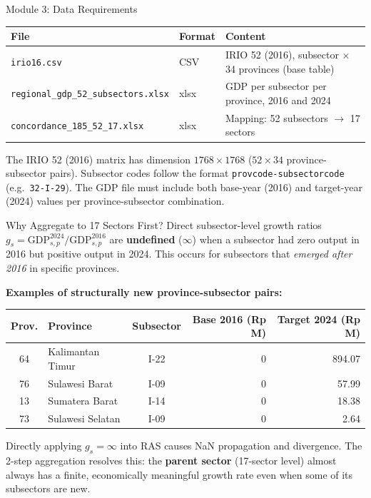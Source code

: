 \documentclass[aspectratio=169]{beamer}
\begin{document}
\begin{frame}{Module 3: Data Requirements}
\begin{center}
\renewcommand{\arraystretch}{1.3}
\scriptsize
\begin{tabular}{@{}p{5.0cm}p{1.0cm}p{6.6cm}@{}}
\toprule
\textbf{File} & \textbf{Format} & \textbf{Content} \\
\midrule
\texttt{irio16.csv} & CSV & IRIO 52 (2016), subsector $\times$ 34 provinces (base table) \\
\texttt{regional\_gdp\_52\_subsectors.xlsx} & xlsx & GDP per subsector per province, 2016 and 2024 \\
\texttt{concordance\_185\_52\_17.xlsx} & xlsx & Mapping: 52 subsectors $\to$ 17 sectors \\
\bottomrule
\end{tabular}
\end{center}

\medskip
\small
The IRIO 52 (2016) matrix has dimension $1768 \times 1768$ ($52 \times 34$ province-subsector pairs). Subsector codes follow the format \texttt{provcode-subsectorcode} (e.g.\ \texttt{32-I-29}). The GDP file must include both base-year (2016) and target-year (2024) values per province-subsector combination.
\end{frame}

\begin{frame}{Why Aggregate to 17 Sectors First?}
Direct subsector-level growth ratios $g_s = \text{GDP}_{s,p}^{2024} / \text{GDP}_{s,p}^{2016}$ are \textbf{undefined} ($\infty$) when a subsector had zero output in 2016 but positive output in 2024. This occurs for subsectors that \textit{emerged after 2016} in specific provinces.

\medskip
\textbf{Examples of structurally new province-subsector pairs:}

\begin{center}
\renewcommand{\arraystretch}{1.2}
\begin{tabular}{clcrr}
\toprule
\textbf{Prov.} & \textbf{Province} & \textbf{Subsector} & \textbf{Base 2016 (Rp M)} & \textbf{Target 2024 (Rp M)} \\
\midrule
64 & Kalimantan Timur  & I-22 & 0 & 894.07 \\
76 & Sulawesi Barat    & I-09 & 0 &  57.99 \\
13 & Sumatera Barat    & I-14 & 0 &  18.38 \\
73 & Sulawesi Selatan  & I-09 & 0 &   2.64 \\
\bottomrule
\end{tabular}
\end{center}

\medskip
\small
Directly applying $g_s = \infty$ into RAS causes NaN propagation and divergence. The 2-step aggregation resolves this: the \textbf{parent sector} (17-sector level) almost always has a finite, economically meaningful growth rate even when some of its subsectors are new.
\end{frame}
\end{document}
